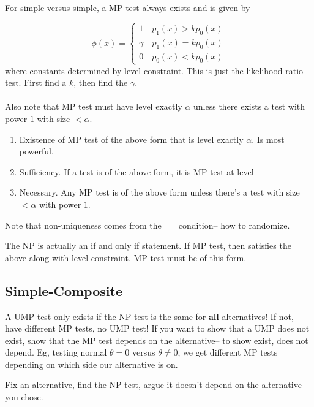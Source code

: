 \documentclass{article}
\begin{document}
\begin{theorem}
For simple versus simple, a MP test always exists and is given by 

$$\phi(x) = \begin{cases}
	1 \quad p_1(x) >kp_0(x)\\
	\gamma \quad p_1(x) = kp_0(x)\\
	0 \quad p_0(x) <kp_0(x)
\end{cases}$$
where constants determined by level constraint. This is just the likelihood ratio test. First find a $k$, then find the $\gamma$. \\\\ Also note that MP test must have level exactly $\alpha$ unless there exists a test with power $1$ with size $<\alpha$. \\

\begin{enumerate}
	\item Existence of MP test of the above form that is level exactly $\alpha$. Is most powerful.
	\item Sufficiency. If a test is of the above form, it is MP test at level
	\item Necessary. Any MP test is of the above form unless there's a test with size $<\alpha$ with power $1$. 
\end{enumerate}
\end{theorem}
Note that non-uniqueness comes from the $=$ condition-- how to randomize. 
\begin{fact}
The NP is actually an if and only if statement. If MP test, then satisfies the above along with level constraint. MP test must be of this form.
\end{fact}
\subsection{Simple-Composite }
A UMP test only exists if the NP test is the same for \textbf{all} alternatives! If not, have different MP tests, no UMP test! If you want to show that a UMP does not exist, show that the MP test depends on the alternative-- to show exist, does not depend. Eg, testing normal $\theta=0$ versus $\theta\neq 0$, we get different MP tests depending on which side our alternative is on. 
\begin{recipe}
Fix an alternative, find the NP test, argue it doesn't depend on the alternative you chose.
\end{recipe}
\end{document}
